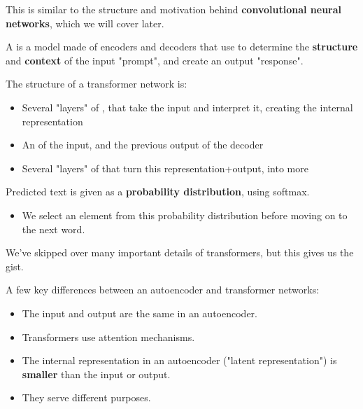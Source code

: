         This is similar to the structure and motivation behind \textbf{convolutional neural networks}, which we will cover later.\\

        \begin{definition}
            A  is a model made of encoders and decoders that use  to determine the \textbf{structure} and \textbf{context} of the input "prompt", and create an output "response".


            The structure of a transformer network is:
            
            \begin{itemize}
                \item Several "layers" of , that take the input and interpret it, creating the internal representation
                \item An  of the input, and the previous output of the decoder
                \item Several "layers" of  that turn this representation+output, into more 
            \end{itemize}

            Predicted text is given as a \textbf{probability distribution}, using softmax.

            \begin{itemize}
                \item We select an element from this probability distribution before moving on to the next word.
            \end{itemize}
        \end{definition}

        We've skipped over many important details of transformers, but this gives us the gist.
            \\

        \begin{clarification}
            A few key differences between an autoencoder and transformer networks:

            \begin{itemize}
                \item The input and output are the same in an autoencoder.
                \item Transformers use attention mechanisms.
                \item The internal representation in an autoencoder ("latent representation") is \textbf{smaller} than the input or output.
                \item They serve different purposes.
            \end{itemize}
        \end{clarification}

